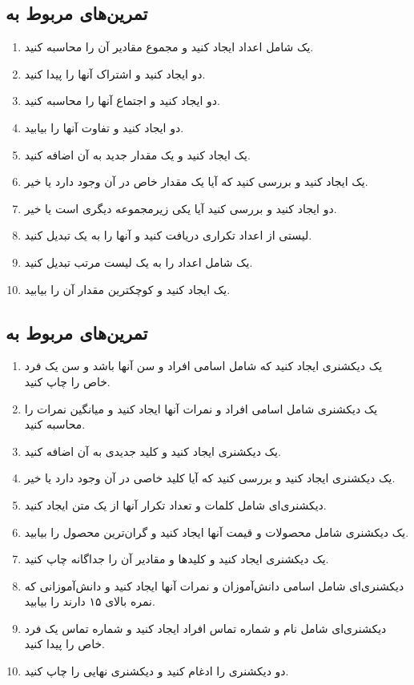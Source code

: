 \documentclass[a4paper,12pt]{article}
\begin{document}
	\subsection*{تمرین‌های مربوط به }
	
	\begin{enumerate}
		\item یک  شامل اعداد ایجاد کنید و مجموع مقادیر آن را محاسبه کنید.
		\item دو  ایجاد کنید و اشتراک آنها را پیدا کنید.
		\item دو  ایجاد کنید و اجتماع آنها را محاسبه کنید.
		\item دو  ایجاد کنید و تفاوت آنها را بیابید.
		\item یک  ایجاد کنید و یک مقدار جدید به آن اضافه کنید.
		\item یک  ایجاد کنید و بررسی کنید که آیا یک مقدار خاص در آن وجود دارد یا خیر.
		\item دو  ایجاد کنید و بررسی کنید آیا یکی زیرمجموعه دیگری است یا خیر.
		\item لیستی از اعداد تکراری دریافت کنید و آنها را به یک  تبدیل کنید.
		\item یک  شامل اعداد را به یک لیست مرتب تبدیل کنید.
		\item یک  ایجاد کنید و کوچکترین مقدار آن را بیابید.
	\end{enumerate}
	
	\subsection*{تمرین‌های مربوط به }
	
	\begin{enumerate}
		\item یک دیکشنری ایجاد کنید که شامل اسامی افراد و سن آنها باشد و سن یک فرد خاص را چاپ کنید.
		\item یک دیکشنری شامل اسامی افراد و نمرات آنها ایجاد کنید و میانگین نمرات را محاسبه کنید.
		\item یک دیکشنری ایجاد کنید و کلید جدیدی به آن اضافه کنید.
		\item یک دیکشنری ایجاد کنید و بررسی کنید که آیا کلید خاصی در آن وجود دارد یا خیر.
		\item دیکشنری‌ای شامل کلمات و تعداد تکرار آنها از یک متن ایجاد کنید.
		\item یک دیکشنری شامل محصولات و قیمت آنها ایجاد کنید و گران‌ترین محصول را بیابید.
		\item یک دیکشنری ایجاد کنید و کلیدها و مقادیر آن را جداگانه چاپ کنید.
		\item دیکشنری‌ای شامل اسامی دانش‌آموزان و نمرات آنها ایجاد کنید و دانش‌آموزانی که نمره بالای ۱۵ دارند را بیابید.
		\item دیکشنری‌ای شامل نام و شماره تماس افراد ایجاد کنید و شماره تماس یک فرد خاص را پیدا کنید.
		\item دو دیکشنری را ادغام کنید و دیکشنری نهایی را چاپ کنید.
	\end{enumerate}
	
\end{document}
